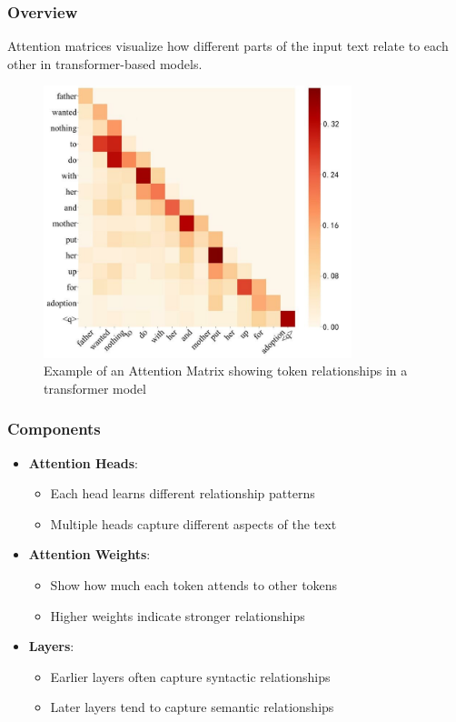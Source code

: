 \documentclass{article}
\begin{document}
\subsubsection{Overview}
Attention matrices visualize how different parts of the input text relate to each other in transformer-based models.

\begin{figure}[h]
    \centering
    \includegraphics[width=0.8\textwidth]{images/am.jpg}
    \caption{Example of an Attention Matrix showing token relationships in a transformer model}
    \label{fig:attention_matrix}
\end{figure}

\subsubsection{Components}
\begin{itemize}
    \item \textbf{Attention Heads}:
        \begin{itemize}
            \item Each head learns different relationship patterns
            \item Multiple heads capture different aspects of the text
        \end{itemize}
    \item \textbf{Attention Weights}:
        \begin{itemize}
            \item Show how much each token attends to other tokens
            \item Higher weights indicate stronger relationships
        \end{itemize}
    \item \textbf{Layers}:
        \begin{itemize}
            \item Earlier layers often capture syntactic relationships
            \item Later layers tend to capture semantic relationships
        \end{itemize}
\end{itemize}
\end{document}
